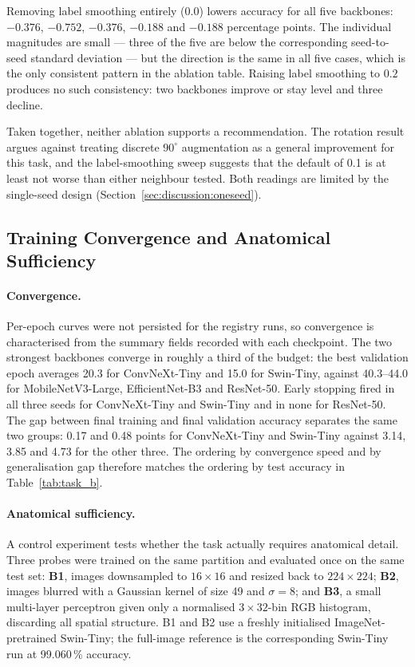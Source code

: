 Removing label smoothing entirely ($0.0$) lowers accuracy for all five
backbones: $-0.376$, $-0.752$, $-0.376$, $-0.188$ and $-0.188$ percentage
points. The individual magnitudes are small --- three of the five are below
the corresponding seed-to-seed standard deviation --- but the direction is
the same in all five cases, which is the only consistent pattern in the
ablation table. Raising label smoothing to $0.2$ produces no such
consistency: two backbones improve or stay level and three decline.

Taken together, neither ablation supports a recommendation. The rotation
result argues against treating discrete $90^\circ$ augmentation as a general
improvement for this task, and the label-smoothing sweep suggests that the
default of 0.1 is at least not worse than either neighbour tested. Both
readings are limited by the single-seed design
(Section~\ref{sec:discussion:oneseed}).

\subsection{Training Convergence and Anatomical Sufficiency}
\label{sec:results:convergence}

\paragraph{Convergence.} Per-epoch curves were not persisted for the registry
runs, so convergence is characterised from the summary fields recorded with
each checkpoint. The two strongest backbones converge in roughly a third of
the budget: the best validation epoch averages 20.3 for ConvNeXt-Tiny and
15.0 for Swin-Tiny, against 40.3--44.0 for MobileNetV3-Large,
EfficientNet-B3 and ResNet-50. Early stopping fired in all three seeds for
ConvNeXt-Tiny and Swin-Tiny and in none for ResNet-50. The gap between final
training and final validation accuracy separates the same two groups: 0.17
and 0.48 points for ConvNeXt-Tiny and Swin-Tiny against 3.14, 3.85 and 4.73
for the other three. The ordering by convergence speed and by generalisation
gap therefore matches the ordering by test accuracy in
Table~\ref{tab:task_b}.

\paragraph{Anatomical sufficiency.} A control experiment tests whether the
task actually requires anatomical detail. Three probes were trained on the
same partition and evaluated once on the same test set: \textbf{B1}, images
downsampled to $16\times16$ and resized back to $224\times224$; \textbf{B2},
images blurred with a Gaussian kernel of size 49 and $\sigma=8$; and
\textbf{B3}, a small multi-layer perceptron given only a normalised
$3\times32$-bin RGB histogram, discarding all spatial structure. B1 and B2
use a freshly initialised ImageNet-pretrained Swin-Tiny; the full-image
reference is the corresponding Swin-Tiny run at 99.060\,\% accuracy.


